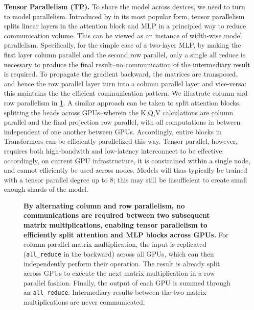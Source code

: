 \documentclass{article}
\DeclareRobustCommand{\hardware}[1]{\textcolor{Mahogany}{#1}}
\begin{document}
\textbf{Tensor Parallelism (TP).} To share the model across devices, we need to turn to model parallelism. Introduced by \citet{megatron-1} in its most popular form, tensor parallelism splits linear layers in the attention block and MLP in a principled way to reduce communication volume. This can be viewed as an instance of width-wise model parallelism. Specifically, for the simple case of a two-layer MLP, by making the first layer column parallel and the second row parallel, only a single all reduce is necessary to produce the final result--no communication of the intermediary result is required. To propagate the gradient backward, the matrices are transposed, and hence the row parallel layer turn into a column parallel layer and vice-versa: this maintains the the efficient communication pattern. We illustrate column and row parallelism in \cref{fig:tp}. A similar approach can be taken to split attention blocks, splitting the heads across GPUs--wherein the K,Q,V calculations are column parallel and the final projection row parallel, with all computations in between independent of one another between GPUs. Accordingly, entire blocks in Transformers can be efficiently parallelized this way. Tensor parallel, however, requires both high-bandwith and low-latency interconnect to be effective: accordingly, on current GPU infrastructure, it is constrained within a single node, and cannot efficiently be used across nodes. Models will thus typically be trained with a tensor parallel degree up to 8; this may still be insufficient to create small enough shards of the model.

\begin{figure}
    \centering
    
    
    \caption{\textbf{\hardware{By alternating column and row parallelism, no communications are required between two subsequent matrix multiplications, enabling tensor parallelism to efficiently split attention and MLP blocks across GPUs.}} For column parallel matrix multiplication, the input is replicated (\texttt{all\_reduce} in the backward) across all GPUs, which can then independently perform their operation. The result is already split across GPUs to execute the next matrix multiplication in a row parallel fashion. Finally, the output of each GPU is summed through an \texttt{all\_reduce}. Intermediary results between the two matrix multiplications are never communicated.}
    \label{fig:tp}
\end{figure}
\end{document}

